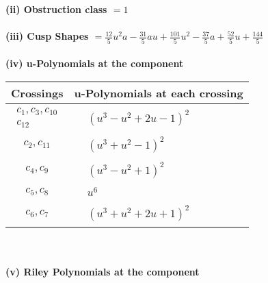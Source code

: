 \documentclass[1p]{elsarticle_modified}
\theoremstyle{definition}
\begin{document}
\flushleft \textbf{(ii) Obstruction class $= 1$}\\~\\
\flushleft \textbf{(iii) Cusp Shapes $= \frac{12}{5} u^2 a-\frac{31}{5} a u+\frac{101}{5} u^2-\frac{37}{5} a+\frac{52}{5} u+\frac{144}{5}$}\\~\\
\newpage\renewcommand{\arraystretch}{1}
\flushleft \textbf{(iv) u-Polynomials at the component}\newline \\
\begin{tabular}{m{50pt}|m{274pt}}
Crossings & \hspace{64pt}u-Polynomials at each crossing \\
\hline $$\begin{aligned}c_{1},c_{3},c_{10}\\c_{12}\end{aligned}$$&$\begin{aligned}
&(u^3- u^2+2 u-1)^2
\end{aligned}$\\
\hline $$\begin{aligned}c_{2},c_{11}\end{aligned}$$&$\begin{aligned}
&(u^3+u^2-1)^2
\end{aligned}$\\
\hline $$\begin{aligned}c_{4},c_{9}\end{aligned}$$&$\begin{aligned}
&(u^3- u^2+1)^2
\end{aligned}$\\
\hline $$\begin{aligned}c_{5},c_{8}\end{aligned}$$&$\begin{aligned}
&u^6
\end{aligned}$\\
\hline $$\begin{aligned}c_{6},c_{7}\end{aligned}$$&$\begin{aligned}
&(u^3+u^2+2 u+1)^2
\end{aligned}$\\
\hline
\end{tabular}\\~\\
\newpage\renewcommand{\arraystretch}{1}
\flushleft \textbf{(v) Riley Polynomials at the component}\newline \\
\end{document}
